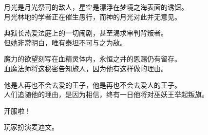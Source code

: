 月光是月光祭司的敌人，星空是漂浮在梦境之海表面的诱饵。\\
月光林地的学者正在催生愚行，而神的月光对此并无意见。

典狱长热爱法庭上的一切闹剧，甚至渴求审判背叛者。\\
但她非常明白，唯有泰坦不可与之为敌。

魔力的欲望刻写在血精灵体内，永恒之井的恩赐仍有留存。\\
血魔法师将这秘密告知旅人，因为他有这样做的理由。

他是人再也不会去爱的王子，他是再也不会去爱人的王子。\\
人们追随他的理由，是因为相信，终有一日他将对巫妖王举起叛旗。
















\clearpage{} %


开服啦！



玩家扮演麦迪文。

